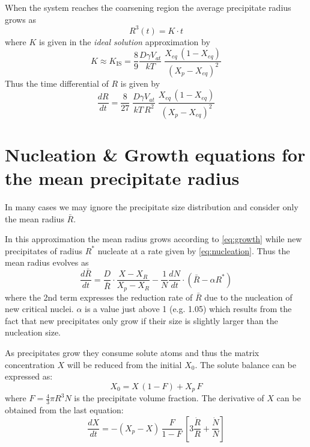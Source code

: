 \documentclass[12pt,a4paper]{article}
\begin{document}
When the system reaches the coarsening region the average precipitate radius grows as
\begin{equation}
R^3(t) = K\cdot t
\end{equation}
where $K$ is given in the \textit{ideal solution} approximation by \citep{Calderon-1994-Ostwaldripeningin}
\begin{equation}
K\approx K_{\text{IS}} = \frac{8}{9}\frac{D \gamma V_{at}}{kT}\;
\frac{X_{eq}\, (1-X_{eq})}{(X_p - X_{eq} )^2}
\end{equation}
Thus the time differential of $R$ is given by
\begin{equation}
\frac{dR}{dt} = \frac{8}{27}\;
\frac{D \gamma V_{at}}{kT\,R^2}\;
\frac{X_{eq}\, (1-X_{eq})}{(X_p - X_{eq} )^2}
\end{equation}

\section{Nucleation \& Growth equations for the mean precipitate radius}

In many cases we may ignore the precipitate size distribution and consider only the mean radius $\bar{R}$.

In this approximation the mean radius grows according to \eqref{eq:growth} while new precipitates of radius $R^*$ nucleate at a rate given by \eqref{eq:nucleation}. Thus the mean radius evolves as 
\begin{equation}
\label{P_radius}
\frac{d\bar{R}}{dt} = \frac{D}{\bar{R}} \cdot \frac{X - X_R}{X_p - X_R} - \frac{1}{N}\frac{dN}{dt} \cdot (\bar{R} - \alpha R^*)
\end{equation}
where the 2nd term expresses the reduction rate of $\bar{R}$ due to the nucleation of new critical nuclei. $\alpha$ is a value just above 1 (e.g. 1.05) which results from the fact that new precipitates only grow if their size is slightly larger than the nucleation size.

As precipitates grow they consume solute atoms and thus the matrix concentration $X$ will be reduced from the initial $X_0$. The solute balance can be expressed as:
\begin{equation}
X_0 = X\,(1-F) + X_p\,F
\end{equation}
where $F=\frac{4}{3}\pi R^3 N$ is the precipitate volume fraction. The derivative of $X$ can be obtained from the last equation:
\begin{equation}
\frac{dX}{dt} = -(X_p - X)\, \frac{F}{1-F} \,
\left[ 3\frac{\dot{R}}{R} + \frac{\dot{N}}{N} \right]
\end{equation}  
\end{document}

